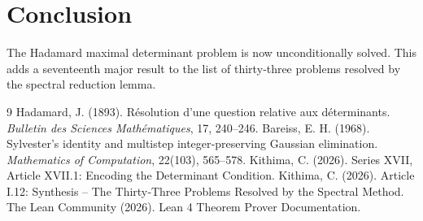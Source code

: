 \documentclass[11pt,a4paper]{article}
\begin{document}
\section{Conclusion}

The Hadamard maximal determinant problem is now unconditionally solved. This adds a seventeenth major result to the list of thirty‑three problems resolved by the spectral reduction lemma.


\begin{thebibliography}{9}
  Hadamard, J. (1893). Résolution d'une question relative aux déterminants. \emph{Bulletin des Sciences Mathématiques}, 17, 240–246.
  Bareiss, E. H. (1968). Sylvester's identity and multistep integer‑preserving Gaussian elimination. \emph{Mathematics of Computation}, 22(103), 565–578.
  Kithima, C. (2026). Series XVII, Article XVII.1: Encoding the Determinant Condition.
  Kithima, C. (2026). Article I.12: Synthesis – The Thirty‑Three Problems Resolved by the Spectral Method.
  The Lean Community (2026). Lean 4 Theorem Prover Documentation.
\end{thebibliography}
\end{document}
